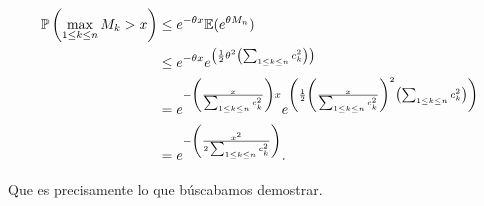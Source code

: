 \begin{align}
    \mathbb{P}\left( \max_{1 \leq k \leq n} M_k > x \right)    &\leq   e^{- \theta x} \mathbb{E}(e^{\theta M_n})                                                                                                                                                           \\
                                                        &\leq   e^{- \theta x} e^{\left( \frac{1}{2} \theta^2 \left( \sum_{1 \leq k \leq n} c_k^2 \right)\right)}                                                                                           \\
                                                        &=      e^{- \left(\frac{x}{\sum_{1 \leq k \leq n} c_k^2}\right) x} e^{\left( \frac{1}{2} \left(\frac{x}{\sum_{1 \leq k \leq n} c_k^2}\right)^2 \left( \sum_{1 \leq k \leq n} c_k^2 \right)\right)} \\
                                                        &=      e^{- \left(\frac{x^2}{2 \sum_{1 \leq k \leq n} c_k^2}\right)}.
\end{align}\par\null

Que es precisamente lo que búscabamos demostrar.

